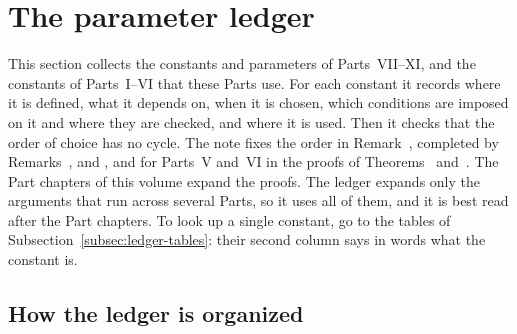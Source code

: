 \section{The parameter ledger}\label{sec:ledger}

This section collects the constants and parameters of Parts~VII--XI, and the constants of Parts~I--VI that these Parts use. For each constant it records where it is defined, what it depends on, when it is chosen, which conditions are imposed on it and where they are checked, and where it is used. Then it checks that the order of choice has no cycle. The note fixes the order in Remark~, completed by Remarks~,  and , and for Parts~V and~VI in the proofs of Theorems~ and~. The Part chapters of this volume expand the proofs. The ledger expands only the arguments that run across several Parts, so it uses all of them, and it is best read after the Part chapters. To look up a single constant, go to the tables of Subsection~\ref{subsec:ledger-tables}: their second column says in words what the constant is.

\subsection{How the ledger is organized}\label{subsec:ledger-org}

